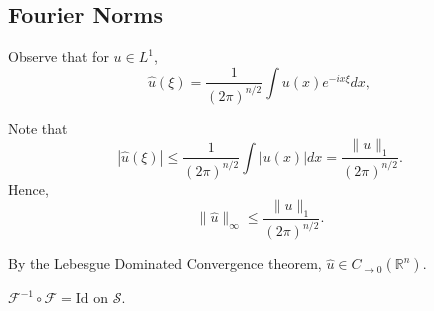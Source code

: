 \documentclass[11pt]{scrartcl}
\newcommand{\R}{\mathbb{R}}
\renewcommand{\hat}{\widehat}
\begin{document}
\subsection{Fourier Norms}
Observe that for $u \in L^1$, 
$$\hat{u}(\xi) = \frac{1}{(2\pi)^{n/2}} \int u(x)e^{-ix\xi}dx,$$

Note that 
$$|\hat{u}(\xi)| \le \frac{1}{(2\pi)^{n/2}} \int |u(x)|dx = \frac{\|u\|_1}{(2\pi)^{n/2}}.$$
Hence,
$$\|\hat{u}\|_{\infty} \le \frac{\|u\|_1}{(2\pi)^{n/2}}.$$

By the Lebesgue Dominated Convergence theorem, $\hat{u} \in C_{\to 0}(\R^n)$.

\begin{exercise} $\mathcal F^{-1} \circ \mathcal F = \text{Id}$ on $\mathcal S$.
\end{exercise}
\end{document}
